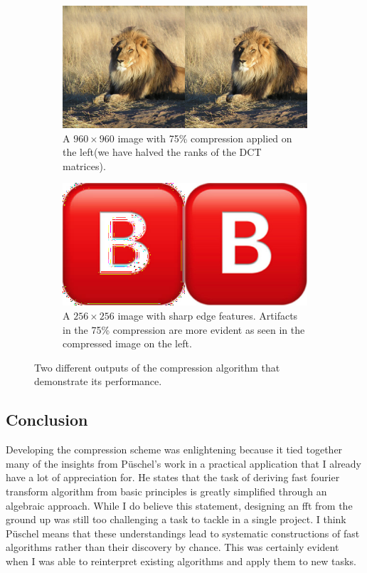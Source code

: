 \documentclass[12pt,technote]{IEEEtran}
\begin{document}
\begin{figure}[h]
    \centering
    \begin{subfigure}[m]{0.5\textwidth}
        \centering
        \includegraphics[width=\textwidth]{figures/lion_compare.jpg}
        \caption{A $960\times 960$ image with 75\% compression applied on the left(we have halved the ranks of the DCT matrices).}
        \label{fig:lion}
    \end{subfigure}
    \hfill
    \begin{subfigure}[b]{0.5\textwidth}
        \centering
        \includegraphics[width=\textwidth]{figures/b_compare.jpg}
        \caption{A $256\times 256$ image with sharp edge features. Artifacts in the 75\% compression are more evident as seen in the compressed image on the left.}
        \label{fig:letter_b}
    \end{subfigure}
    \caption{Two different outputs of the compression algorithm that demonstrate its performance.}
    \label{fig:compression_outputs}
\end{figure}
\subsection{Conclusion}
Developing the compression scheme was enlightening because it tied together many of the insights from P\"uschel's work in a practical application that I already have a lot of appreciation for. He states that the task of deriving fast fourier transform algorithm from basic principles is greatly simplified through an algebraic approach. While I do believe this statement, designing an fft from the ground up was still too challenging a task to tackle in a single project. I think P\"uschel means that these understandings lead to systematic constructions of fast algorithms rather than their discovery by chance. This was certainly evident when I was able to reinterpret existing algorithms and apply them to new tasks.


\end{document}
